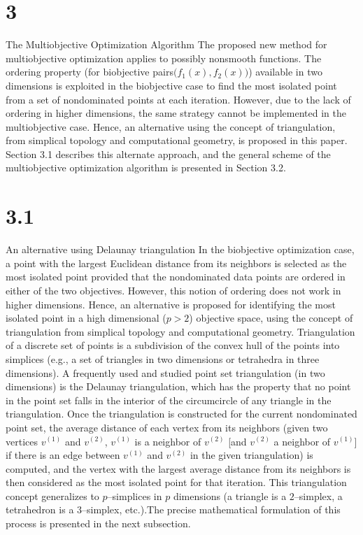 \section{3}{The Multiobjective Optimization Algorithm}
The proposed new method for multiobjective optimization applies to possibly
nonsmooth functions. The ordering property (for biobjective pairs$
\bigl(f_1(x),f_2(x)\bigr)$) available in two dimensions is exploited in the
biobjective case to find the most isolated point from a set of nondominated
points at each iteration. However, due to the lack of ordering in higher
dimensions, the same strategy cannot be implemented in the multiobjective case.
Hence, an alternative using the concept of triangulation, from simplical
topology and computational geometry, is proposed in this paper.  Section 3.1
describes this alternate approach, and the general scheme of the multiobjective
optimization algorithm is presented in Section 3.2.

\section{3.1}{An alternative using Delaunay triangulation}
In the biobjective optimization case, a point with the largest Euclidean
distance from its neighbors is selected as the most isolated point provided
that the nondominated data points are ordered in either of the two objectives.
However, this notion of ordering does not work in higher dimensions. Hence, an
alternative is proposed for identifying the most isolated point in a high
dimensional ($p>2$) objective space, using the concept of triangulation from
simplical topology and computational geometry.  Triangulation of a discrete set
of points is a subdivision of the convex hull of the points into simplices
(e.g., a set of triangles in two dimensions or tetrahedra in three dimensions).
A frequently used and studied point set triangulation (in two dimensions) is
the Delaunay triangulation, which has the property that no point in the point
set falls in the interior of the circumcircle of any triangle in the
triangulation.  Once the triangulation is constructed for the current
nondominated point set, the average distance of each vertex from its neighbors
(given two vertices $v^{(1)}$ and $v^{(2)}$, $v^{(1)}$ is a neighbor of
$v^{(2)}$ [and $v^{(2)}$ a neighbor of $v^{(1)}$] if there is an edge between
$v^{(1)}$ and $v^{(2)}$ in the given triangulation) is computed, and the vertex
with the largest average distance from its neighbors is then considered as the
most isolated point for that iteration. This triangulation concept generalizes
to $p$--simplices in $p$ dimensions (a triangle is a $2$--simplex, a
tetrahedron is a $3$--simplex, etc.).The precise mathematical formulation of
this process is presented in the next subsection. 

